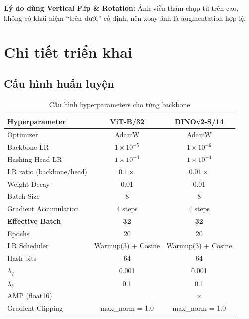 \documentclass[13pt,a4paper]{article}
\newcommand{\tmark}{\checkmark}
\newcommand{\xmark}{$\times$}
\begin{document}
\textbf{Lý do dùng Vertical Flip \& Rotation:} Ảnh viễn thám chụp từ trên cao, không có khái niệm ``trên--dưới'' cố định, nên xoay ảnh là augmentation hợp lệ.


\section{Chi tiết triển khai}

\subsection{Cấu hình huấn luyện}

\begin{table}[H]
\centering
\caption{Cấu hình hyperparameters cho từng backbone}
\label{tab:training_config}
\begin{tabular}{lcc}
\toprule
\textbf{Hyperparameter} & \textbf{ViT-B/32} & \textbf{DINOv2-S/14} \\
\midrule
Optimizer               & AdamW              & AdamW \\
Backbone LR             & $1\times10^{-5}$   & $1\times10^{-6}$ \\
Hashing Head LR         & $1\times10^{-4}$   & $1\times10^{-4}$ \\
LR ratio (backbone/head)& $0.1\times$        & $0.01\times$ \\
Weight Decay            & 0.01               & 0.01 \\
Batch Size              & 8                  & 8 \\
Gradient Accumulation   & 4 steps            & 4 steps \\
\textbf{Effective Batch}& \textbf{32}        & \textbf{32} \\
Epochs                  & 20                 & 20 \\
LR Scheduler            & Warmup(3) + Cosine & Warmup(3) + Cosine \\
Hash bits               & 64                 & 64 \\
$\lambda_q$             & 0.001              & 0.001 \\
$\lambda_b$             & 0.1                & 0.1 \\
AMP (float16)           & \tmark             & \xmark \\
Gradient Clipping       & max\_norm = 1.0    & max\_norm = 1.0 \\
\bottomrule
\end{tabular}
\end{table}
\end{document}
